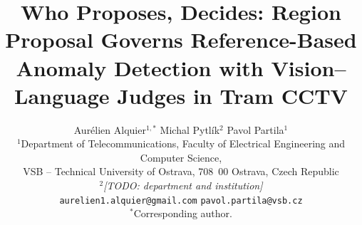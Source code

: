 %
%
%
%

\title{\bfseries Who Proposes, Decides: Region Proposal Governs
Reference-Based Anomaly Detection with Vision--Language Judges in Tram CCTV}

\author{%
  Aur\'elien Alquier$^{1,*}$
  \quad Michal Pytl\'ik$^{2}$
  \quad Pavol Partila$^{1}$
  \\[0.6em]
  \small $^{1}$Department of Telecommunications, Faculty of Electrical
  Engineering and Computer Science,\\
  \small VSB -- Technical University of Ostrava, 708~00 Ostrava, Czech Republic\\
  \small $^{2}$\textit{[TODO: department and institution]}
  \\[0.5em]
  \small \texttt{aurelien1.alquier@gmail.com} \quad
  \texttt{pavol.partila@vsb.cz}
  \\[0.4em]
  \small $^{*}$Corresponding author.
}

